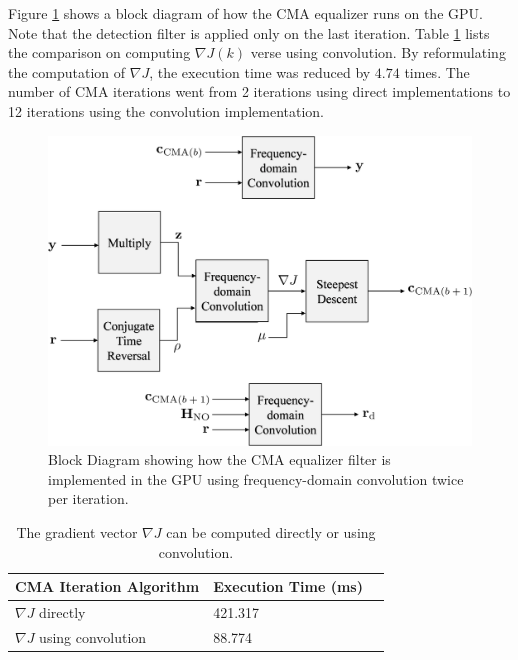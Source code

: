 Figure \ref{fig:blockCMA} shows a block diagram of how the CMA equalizer runs on the GPU.
Note that the detection filter is applied only on the last iteration.
Table \ref{tab:CMAtimingComparison} lists the comparison on computing $\nabla J(k)$ verse using convolution.
By reformulating the computation of $\nabla J$, the execution time was reduced by $4.74$ times.
The number of CMA iterations went from 2 iterations using direct implementations to 12 iterations using the convolution implementation.
\begin{figure}
	\centering\includegraphics[width=8.34in/100*55]{figures/eq_GPUimplementation/blockCMA.pdf}
	\caption{Block Diagram showing how the CMA equalizer filter is implemented in the GPU using frequency-domain convolution twice per iteration.}
	\label{fig:blockCMA}
\end{figure}
\begin{table}
\caption{The gradient vector $\nabla J$ can be computed directly or using convolution.}
\begin{center}
\begin{tabular}{lll}
	\toprule
	CMA	Iteration Algorithm		& Execution Time (ms)	\\ \midrule
	$\nabla J$ directly 		& 421.317				\\
	$\nabla J$ using convolution & 88.774				\\
	\bottomrule
\end{tabular}
\end{center}
\label{tab:CMAtimingComparison}
\end{table}

